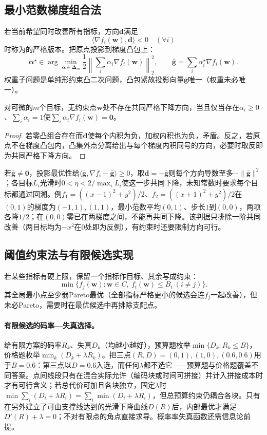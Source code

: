 \subsection{最小范数梯度组合法}

若当前希望同时改善所有指标，方向$\bm d$满足
\[
 \langle\nabla f_i(\bm w),\bm d\rangle<0\quad(\forall i)
\]
时称为的严格版本。把原点投影到梯度凸包上：
\[
 \bm\alpha^\star\in\arg\min_{\bm\alpha\in\bm\Delta_m}
 \frac12\left\|\sum_i\alpha_i\nabla f_i(\bm w)\right\|_2^2,
 \qquad
 \bar{\bm g}=\sum_i\alpha_i^\star\nabla f_i(\bm w).
\]
权重子问题是单纯形约束凸二次问题，凸包紧故投影向量$\bar{\bm g}$唯一（权重未必唯一）。

\begin{theorem}[无共同下降方向的一阶判定]
\label{thm:opt-common-descent}
对可微的$m$个目标，无约束点$\bm w$处不存在共同严格下降方向，当且仅当存在$\alpha_i\geq0$、$\sum_i\alpha_i=1$使$\sum_i\alpha_i\nabla f_i(\bm w)=\bm0$。
\end{theorem}

\begin{proof}
若零凸组合存在而$\bm d$使每个内积为负，加权内积也为负，矛盾。反之，若原点不在梯度凸包内，凸集外点分离给出与每个梯度内积同号的方向，必要时取反即为共同严格下降方向。
\end{proof}

若$\bar{\bm g}\neq\bm0$，投影最优性给$\langle\bar{\bm g},\nabla f_i-\bar{\bm g}\rangle\geq0$，取$\bm d=-\bar{\bm g}$则每个方向导数至多$-\|\bar{\bm g}\|^2$；各目标$L_i$光滑时$0<\eta<2/\max_iL_i$使这一步共同下降，未知常数时要求每个目标都通过回溯。例$f_1=((x-1)^2+y^2)/2$、$f_2=((x+1)^2+y^2)/2$在$(0,1)$的梯度为$(-1,1),(1,1)$，最小范数平均$(0,1)$、步长$1$到$(0,0)$，两项各降$1/2$；在$(0,0)$零已在两梯度之间，不能再共同下降。该判据只排除一阶共同改善（两目标均为$-x^2$在$0$处即为反例），有约束时还要限制方向可行。

\subsection{阈值约束法与有限候选实现}

若某些指标有硬上限，保留一个指标作目标、其余写成约束：
\[
 \min\{f_j(\bm w):\bm w\in C,\ f_i(\bm w)\leq B_i\ (i\neq j)\}.
\]
其全局最小点至少弱Pareto最优（全部指标严格更小的候选会连$f_j$一起改善），但未必Pareto，需要时在最优候选中再排除支配点。

\paragraph{有限候选的码率—失真选择。}
给有限方案的码率$R_k$、失真$D_k$（均越小越好），预算题枚举$\min\{D_k:R_k\leq B\}$，价格题枚举$\min_k(D_k+\lambda R_k)$。把三点$(R,D)=(0,1),(1,0),(0.6,0.6)$用于$B=0.6$：第三点以$D=0.6$入选，而任何$\lambda$都不选它——预算题与价格题覆盖不同答案。点间线段只有在混合实际允许（编码块或时间可拼接）并计入拼接成本时才有可行含义；若总代价可加且各块独立，固定$\lambda$时$\min\sum_i(D_i+\lambda R_i)=\sum_i\min(D_i+\lambda R_i)$，但总预算约束仍耦合各块。只有在另外建立了可由支撑线达到的光滑下降曲线$D(R)$后，内部最优才满足$D'(R)+\lambda=0$；不对有限点的角点直接求导。概率率失真函数还需信息论前提。

